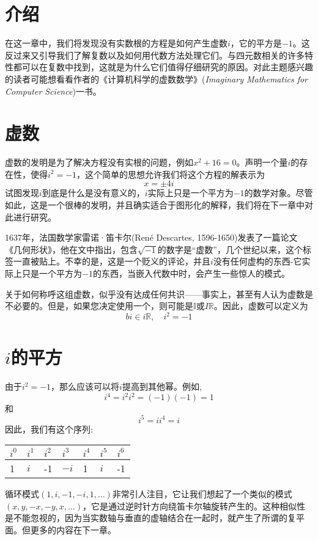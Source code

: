 
\section{介绍}
在这一章中，我们将发现没有实数根的方程是如何产生虚数$i$，它的平方是$-1$。这反过来又引导我们了解复数以及如何用代数方法处理它们。与四元数相关的许多特性都可以在复数中找到，这就是为什么它们值得仔细研究的原因。对此主题感兴趣的读者可能想看看作者的《计算机科学的虚数数学》(\textit{Imaginary Mathematics for Computer Science})一书\cite{bib3-1}。

\section{虚数}
虚数的发明是为了解决方程没有实根的问题，例如$x^{2}+16=0$。声明一个量$i$的存在性，使得$i^{2}=-1$，这个简单的思想允许我们将这个方程的解表示为
$$
x= \pm 4 i
$$
试图发现$i$到底是什么是没有意义的，$i$实际上只是一个平方为$-1$的数学对象。尽管如此，这是一个很棒的发明，并且确实适合于图形化的解释，我们将在下一章中对此进行研究。

1637年，法国数学家雷诺·笛卡尔(René Descartes, 1596-1650)发表了一篇论文《几何形状》\cite{bib3-2}，他在文中指出，包含$\sqrt{-1}$的数字是“虚数”，几个世纪以来，这个标签一直被贴上。不幸的是，这是一个贬义的评论，并且$i$没有任何虚构的东西-它实际上只是一个平方为$-1$的东西，当嵌入代数中时，会产生一些惊人的模式。

关于如何称呼这组虚数，似乎没有达成任何共识——事实上，甚至有人认为虚数是不必要的。但是，如果您决定使用一个，则可能是$\mathbb{I}$或$ I \mathbb{R}$。因此，虚数可以定义为
$$
b i \in i \mathbb{R}, \quad i^{2}=-1
$$

\section{\boldmath$i$的平方}

由于$i^{2}=-1$，那么应该可以将$i$提高到其他幂。例如,
$$
i^{4}=i^{2} i^{2}=(-1)(-1)=1
$$
和
$$
i^{5}=i i^{4}=i
$$
因此，我们有这个序列:
\begin{center}
\begin{tabular}{lllllll}
\hline
$i^{0}$ & $i^{1}$ & $i^{2}$ & $i^{3}$ & $i^{4}$ & $i^{5}$ & $i^{6}$ \\
\hline
1 & $i$ & -1 & $-i$ & 1 & $i$ & -1 \\
\hline
\end{tabular}
\end{center}

循环模式$(1,i,-1,-i, 1, \ldots)$非常引人注目，它让我们想起了一个类似的模式$(x, y,-x,-y, x, \ldots)$，它是通过逆时针方向绕笛卡尔轴旋转产生的。这种相似性是不能忽视的，因为当实数轴与垂直的虚轴结合在一起时，就产生了所谓的复平面。但更多的内容在下一章。

